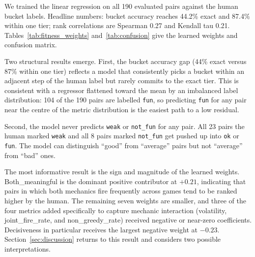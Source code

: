 \documentclass[conference]{IEEEtran}
\begin{document}
  We trained the linear regression on all 190 evaluated pairs against the human
  bucket labels. Headline numbers: bucket accuracy reaches 44.2\% exact and     
  87.4\% within one tier; rank correlations are Spearman 0.27 and Kendall tau 
  0.21. Tables~\ref{tab:fitness_weights} and~\ref{tab:confusion} give the       
  learned weights and confusion matrix. 
                                                                                
  Two structural results emerge. First, the bucket accuracy gap (44\% exact     
  versus 87\% within one tier) reflects a model that consistently picks a bucket
   within an adjacent step of the human label but rarely commits to the exact   
  tier. This is consistent with a regressor flattened toward the mean by an   
  imbalanced label distribution: 104 of the 190 pairs are labelled \texttt{fun},
   so predicting \texttt{fun} for any pair near the centre of the metric      
  distribution is the easiest path to a low residual.

  Second, the model never predicts \texttt{weak} or \texttt{not\_fun} for any   
  pair. All 23 pairs the human marked \texttt{weak} and all 8 pairs marked
  \texttt{not\_fun} get pushed up into \texttt{ok} or \texttt{fun}. The model   
  can distinguish ``good'' from ``average'' pairs but not ``average'' from    
  ``bad'' ones.                         
                               
  The most informative result is the sign and magnitude of the learned weights.
  Both\_meaningful is the dominant positive contributor at $+0.21$, indicating
  that pairs in which both mechanics fire frequently across games tend to be    
  ranked higher by the human. The remaining seven weights are smaller, and three
   of the four metrics added specifically to capture mechanic interaction       
  (volatility, joint\_fire\_rate, and non\_greedy\_rate) received negative or 
  near-zero coefficients. Decisiveness in particular receives the largest
  negative weight at $-0.23$. Section~\ref{sec:discussion} returns to this
  result and considers two possible interpretations.                            
   
\end{document}
